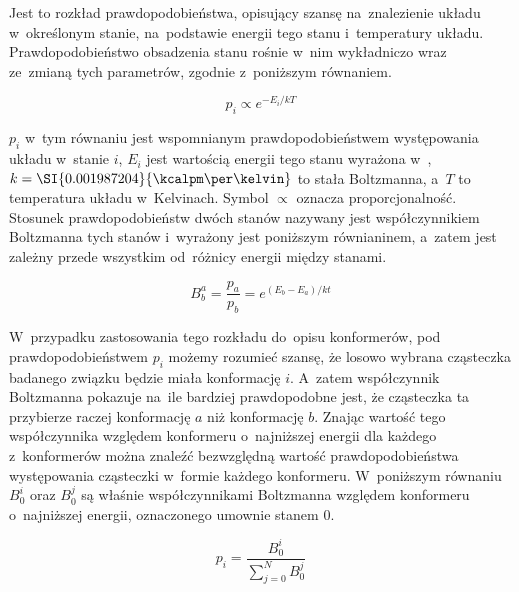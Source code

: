 Jest to rozkład prawdopodobieństwa, opisujący szansę na~znalezienie układu w~określonym stanie,
  na~podstawie energii tego stanu i~temperatury układu.
Prawdopodobieństwo obsadzenia stanu rośnie w~nim wykładniczo wraz ze~zmianą tych parametrów,
  zgodnie z~poniższym równaniem.

\begin{equation}
  p_i \propto e^{-E_i/kT}
\end{equation}

$p_i$ w~tym równaniu jest wspomnianym prawdopodobieństwem występowania układu w~stanie $i$,
  $E_i$ jest wartością energii tego stanu wyrażona w~\si{\kcalpm},
  $k = \SI{0.001987204}{\kcalpm\per\kelvin}$ to stała Boltzmanna,
  a~$T$ to temperatura układu w~Kelvinach.
Symbol $\propto$ oznacza proporcjonalność.
Stosunek prawdopodobieństw dwóch stanów nazywany jest współczynnikiem Boltzmanna tych stanów
  i~wyrażony jest poniższym równianinem, a~zatem jest zależny przede wszystkim od~różnicy
  energii między stanami.

\begin{equation}
  B^a_b = \frac{p_a}{p_b} = e^{(E_b-E_a)/kt}
\end{equation}

W~przypadku zastosowania tego rozkładu do~opisu konformerów, pod prawdopodobieństwem $p_i$
  możemy rozumieć szansę, że losowo wybrana cząsteczka badanego związku będzie miała
  konformację $i$.
A~zatem współczynnik Boltzmanna pokazuje na~ile bardziej prawdopodobne jest, że cząsteczka
  ta przybierze raczej konformację $a$ niż konformację $b$.
Znając wartość tego współczynnika względem konformeru o~najniższej energii dla każdego
  z~konformerów można znaleźć bezwzględną wartość prawdopodobieństwa występowania cząsteczki
  w~formie każdego konformeru.
W~poniższym równaniu $B^i_0$ oraz $B^j_0$ są właśnie współczynnikami Boltzmanna względem
  konformeru o~najniższej energii, oznaczonego umownie stanem $0$.

\begin{equation}
  p_i = \frac{B^i_0}{\sum\limits^N_{j=0}B^j_0}
\end{equation}

